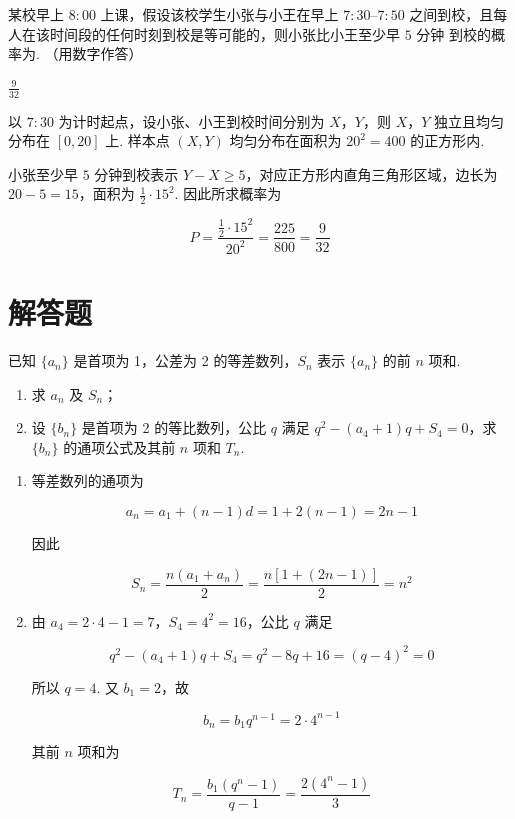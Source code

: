 \begin{problem}
某校早上 \(8{:}00\) 上课，假设该校学生小张与小王在早上 \(7{:}30\text{--}7{:}50\) 之间到校，且每人在该时间段的任何时刻到校是等可能的，则小张比小王至少早 \(5\text{ 分钟}\) 到校的概率为\fillinblank{}. （用数字作答）
\end{problem}

\begin{answer}
\(\frac{9}{32}\)
\end{answer}

\begin{solution}
以 \(7{:}30\) 为计时起点，设小张、小王到校时间分别为 \(X\)，\(Y\)，则 \(X\)，\(Y\) 独立且均匀分布在 \([0,20]\) 上. 样本点 \((X,Y)\) 均匀分布在面积为 \(20^2=400\) 的正方形内.

小张至少早 \(5\) 分钟到校表示 \(Y-X\geqslant5\)，对应正方形内直角三角形区域，边长为 \(20-5=15\)，面积为 \(\frac12\cdot15^2\). 因此所求概率为

\[
P=\frac{\frac12\cdot15^2}{20^2}=\frac{225}{800}=\frac9{32}
\]
\end{solution}

\section{解答题}

\begin{problem}
已知 \(\{a_{n}\}\) 是首项为 1，公差为 2 的等差数列，\(S_{n}\) 表示 \(\{a_{n}\}\) 的前 \(n\) 项和.

\begin{enumerate}
\item 求 \(a_{n}\) 及 \(S_{n}\)；
\item 设 \(\{b_{n}\}\) 是首项为 2 的等比数列，公比 \(q\) 满足 \(q^{2} - (a_{4} + 1)q + S_{4} = 0\)，求 \(\{b_{n}\}\) 的通项公式及其前 \(n\) 项和 \(T_{n}\).
\end{enumerate}
\end{problem}

\begin{solution}
\begin{enumerate}
\item 等差数列的通项为

\[
a_n=a_1+(n-1)d=1+2(n-1)=2n-1
\]

因此

\[
S_n=\frac{n(a_1+a_n)}2=\frac{n[1+(2n-1)]}{2}=n^2
\]

\item 由 \(a_4=2\cdot4-1=7\)，\(S_4=4^2=16\)，公比 \(q\) 满足

\[
q^2-(a_4+1)q+S_4=q^2-8q+16=(q-4)^2=0
\]

所以 \(q=4\). 又 \(b_1=2\)，故

\[
b_n=b_1q^{n-1}=2\cdot4^{n-1}
\]

其前 \(n\) 项和为

\[
T_n=\frac{b_1(q^n-1)}{q-1}
=\frac{2(4^n-1)}3
\]
\end{enumerate}
\end{solution}

